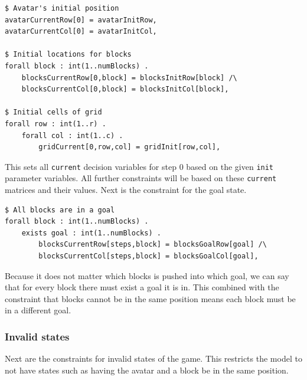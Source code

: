 \documentclass{article}
\begin{document}
\begin{lstlisting}[caption={Constraints for setting initial state variables}, captionpos=b]
$ Avatar's initial position
avatarCurrentRow[0] = avatarInitRow,
avatarCurrentCol[0] = avatarInitCol,

$ Initial locations for blocks
forall block : int(1..numBlocks) .
    blocksCurrentRow[0,block] = blocksInitRow[block] /\
    blocksCurrentCol[0,block] = blocksInitCol[block],

$ Initial cells of grid
forall row : int(1..r) .
    forall col : int(1..c) .
        gridCurrent[0,row,col] = gridInit[row,col],
\end{lstlisting}
This sets all \texttt{current} decision variables for step 0 based on the given \texttt{init} parameter variables. All further constraints will be based on these \texttt{current} matrices and their values. Next is the constraint for the goal state.
\begin{lstlisting}[caption={Constraints for the goal state}, captionpos=b]
$ All blocks are in a goal
forall block : int(1..numBlocks) .
    exists goal : int(1..numBlocks) . 
        blocksCurrentRow[steps,block] = blocksGoalRow[goal] /\
		blocksCurrentCol[steps,block] = blocksGoalCol[goal],
\end{lstlisting}
Because it does not matter which blocks is pushed into which goal, we can say that for every block there must exist a goal it is in. This combined with the constraint that blocks cannot be in the same position means each block must be in a different goal.
\subsubsection{Invalid states}
Next are the constraints for invalid states of the game. This restricts the model to not have states such as having the avatar and a block be in the same position. 
\end{document}
